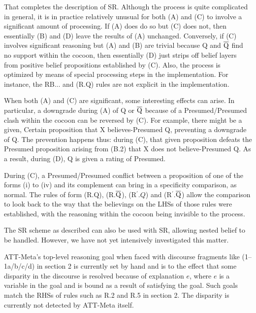 That completes the description of SR.  Although the process is quite
complicated in general, it is in practice relatively unusual for both (A) and
(C) to involve a significant amount of processing.  If (A) does do so but (C)
does not, then essentially (B) and (D) leave the results of (A) unchanged.
Conversely, if (C) involves significant reasoning but (A) and (B) are trivial
because Q and $\overline{{\rm Q}}$ find no support within the cocoon, then
essentially (D) just strips off belief layers from positive belief propositions
established by (C).  Also, the process is optimized by means of special
processing steps in the implementation.  For instance, the RB... and (R.Q)
rules are not explicit in the implementation.

When both (A) and (C) are significant, some interesting effects can arise.  In
particular, a downgrade during (A) of Q or $\overline{{\rm Q}}$ because of a
Presumed/Presumed clash within the cocoon can be reversed by (C). For example,
there might be a given, Certain proposition that X believes-Presumed Q,
preventing a downgrade of Q. The prevention happens thus: during (C), that
given proposition defeats the Presumed proposition arising from (B.2) that X
does not believe-Presumed Q. As a result, during (D), Q is given a rating of
Presumed.

During (C), a Presumed/Presumed conflict between a proposition of one of the
forms (i) to (iv) and its complement can bring in a specificity comparison, as
normal. The rules of form (R.Q), (R.$\overline{{\rm Q}}$), (R$^\prime.Q$) and
(R$^\prime$.$\overline{{\rm Q}}$) allow the comparison to look back to the way
that the believings on the LHSs of those rules were established, with the
reasoning within the cocoon  being invisible to the process.

The SR scheme as described can also be used with SR, allowing nested belief to
be handled. However, we have not yet intensively investigated this matter.


ATT-Meta's top-level reasoning goal when faced with discourse fragments like
(1--1a/b/c/d) in section 2 is currently set by hand and is to the effect that
some disparity in the discourse is resolved because of explanation $e$, where
$e$ is a variable in the goal and is bound as a result of satisfying the goal.
Such goals match the RHSs of rules such as R.2 and R.5 in section 2.  The
disparity is currently not detected by ATT-Meta itself.



